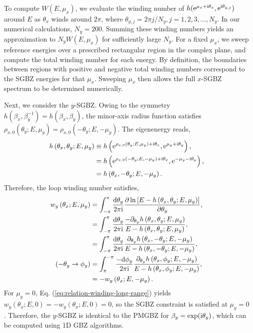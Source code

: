 To compute $W(E,\mu_{x})$, we evaluate the winding number of $h(\mathrm{e}^{\mu_{x}+\mathrm{i}\theta_{x}},\mathrm{e}^{\mathrm{i}\theta_{y,j}})$
around $E$ as $\theta_{x}$ winds around $2\pi$, where $\theta_{y,j}=2\pi j/N_{y},j=1,2,3,\dots,N_{y}$.
In our numerical calculations, $N_{y}=200$. Summing these winding
numbers yields an approximation to $N_{y}W(E,\mu_{x})$ for sufficiently
large $N_{y}$. For a fixed $\mu_{x}$, we sweep reference energies
over a prescribed rectangular region in the complex plane, and compute
the total winding number for each energy. By definition, the boundaries
between regions with positive and negative total winding numbers correspond
to the SGBZ energies for that $\mu_{x}$. Sweeping $\mu_{x}$ then
allows the full $x$-SGBZ spectrum to be determined numerically.

Next, we consider the $y$-SGBZ. Owing to the symmetry $h(\beta_{x},\beta_{y}^{-1})=h(\beta_{x},\beta_{y})$,
the minor-axis radius function satisfies $\rho_{x,0}(\theta_{y};E,\mu_{y})=\rho_{x,0}(-\theta_{y};E,-\mu_{y})$.
The eigenenergy reads, 
\begin{align}
h\left(\theta_{x},\theta_{y};E,\mu_{y}\right) & \equiv h\left(\mathrm{e}^{\rho_{x,0}(\theta_{y};E,\mu_{y})+\mathrm{i}\theta_{x}},\mathrm{e}^{\mu_{y}+\mathrm{i}\theta_{y}}\right),\nonumber \\
 & =h\left(\mathrm{e}^{\rho_{x,0}(-\theta_{y};E,-\mu_{y})+\mathrm{i}\theta_{x}},\mathrm{e}^{-\mu_{y}-\mathrm{i}\theta_{y}}\right),\nonumber \\
 & =h\left(\theta_{x},-\theta_{y};E,-\mu_{y}\right).
\end{align}
Therefore, the loop winding number satisfies, 
\begin{align}
w_{y}\left(\theta_{x};E,\mu_{y}\right) & =\int_{-\pi}^{\pi}\frac{\mathrm{d}\theta_{y}}{2\pi\mathrm{i}}\frac{\partial\ln\left[E-h\left(\theta_{x},\theta_{y};E,\mu_{y}\right)\right]}{\partial\theta_{y}},\nonumber \\
 & =\int_{-\pi}^{\pi}\frac{\mathrm{d}\theta_{y}}{2\pi\mathrm{i}}\frac{-\partial_{\theta_{y}}h\left(\theta_{x},\theta_{y};E,\mu_{y}\right)}{E-h\left(\theta_{x},\theta_{y};E,\mu_{y}\right)},\nonumber \\
 & =\int_{-\pi}^{\pi}\frac{\mathrm{d}\theta_{y}}{2\pi\mathrm{i}}\frac{\partial_{\theta_{y}}h\left(\theta_{x},-\theta_{y};E,-\mu_{y}\right)}{E-h\left(\theta_{x},-\theta_{y};E,-\mu_{y}\right)},\nonumber \\
(-\theta_{y}\rightarrow\phi_{y}) & =\int_{\pi}^{-\pi}\frac{-\mathrm{d}\phi_{y}}{2\pi\mathrm{i}}\frac{\partial_{\theta_{y}}h\left(\theta_{x},\phi_{y};E,-\mu_{y}\right)}{E-h\left(\theta_{x},\phi_{y};E,-\mu_{y}\right)},\nonumber \\
 & =-w_{y}\left(\theta_{x};E,-\mu_{y}\right).\label{eq:relation-winding-long-range}
\end{align}
For $\mu_{y}=0$, Eq. (\ref{eq:relation-winding-long-range}) yields $w_{y}(\theta_{x};E,0)=-w_{y}(\theta_{x};E,0)=0$,
so the SGBZ constraint is satisfied at $\mu_{y}=0$. Therefore, the
$y$-SGBZ is identical to the PMGBZ for $\beta_{y}=\exp(\mathrm{i}\theta_{y})$,
which can be computed using 1D GBZ algorithms.

